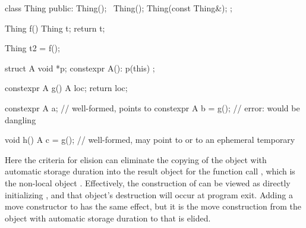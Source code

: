 \pnum
\begin{example}
\begin{codeblock}
class Thing {
public:
  Thing();
  ~Thing();
  Thing(const Thing&);
};

Thing f() {
  Thing t;
  return t;
}

Thing t2 = f();

struct A {
  void *p;
  constexpr A(): p(this) {}
};

constexpr A g() {
  A loc;
  return loc;
}

constexpr A a;          // well-formed,  points to 
constexpr A b = g();    // error:  would be dangling

void h() {
  A c = g();            // well-formed,  may point to  or to an ephemeral temporary
}
\end{codeblock}
Here the criteria for elision can eliminate
the copying of the object  with automatic storage duration
into the result object for the function call ,
which is the non-local object .
Effectively, the construction of 
can be viewed as directly initializing ,
and that object's destruction will occur at program exit.
Adding a move constructor to  has the same effect, but it is the
move construction from the object with automatic storage duration to  that is elided.
\end{example}

